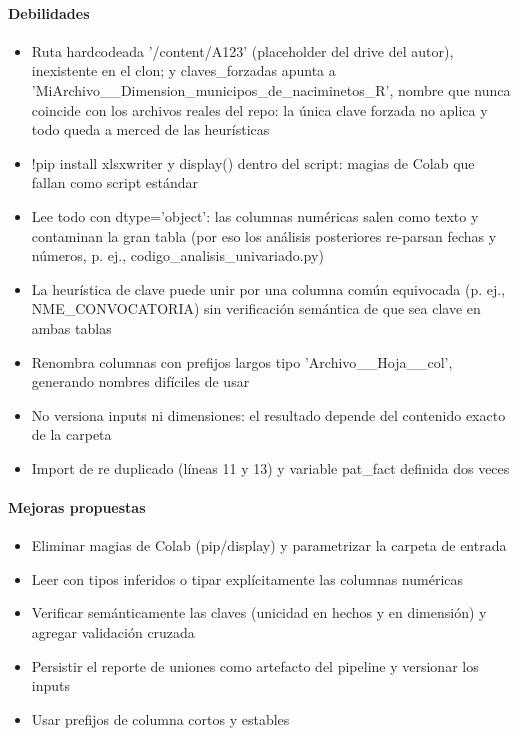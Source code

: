 \paragraph{Debilidades}
\begin{itemize}
  \item Ruta hardcodeada '/content/A123' (placeholder del drive del autor), inexistente en el clon; y claves\_forzadas apunta a 'MiArchivo\_\_Dimension\_municipos\_de\_naciminetos\_R', nombre que nunca coincide con los archivos reales del repo: la única clave forzada no aplica y todo queda a merced de las heurísticas
  \item !pip install xlsxwriter y display() dentro del script: magias de Colab que fallan como script estándar
  \item Lee todo con dtype='object': las columnas numéricas salen como texto y contaminan la gran tabla (por eso los análisis posteriores re-parsan fechas y números, p. ej., codigo\_analisis\_univariado.py)
  \item La heurística de clave puede unir por una columna común equivocada (p. ej., NME\_CONVOCATORIA) sin verificación semántica de que sea clave en ambas tablas
  \item Renombra columnas con prefijos largos tipo 'Archivo\_\_Hoja\_\_col', generando nombres difíciles de usar
  \item No versiona inputs ni dimensiones: el resultado depende del contenido exacto de la carpeta
  \item Import de re duplicado (líneas 11 y 13) y variable pat\_fact definida dos veces
\end{itemize}

\paragraph{Mejoras propuestas}
\begin{itemize}
  \item Eliminar magias de Colab (pip/display) y parametrizar la carpeta de entrada
  \item Leer con tipos inferidos o tipar explícitamente las columnas numéricas
  \item Verificar semánticamente las claves (unicidad en hechos y en dimensión) y agregar validación cruzada
  \item Persistir el reporte de uniones como artefacto del pipeline y versionar los inputs
  \item Usar prefijos de columna cortos y estables
\end{itemize}

